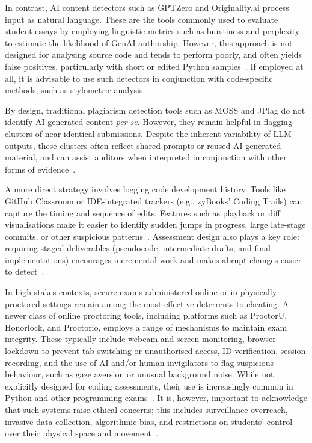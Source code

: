 In contrast, AI content detectors such as GPTZero and Originality.ai process input as natural language. These are the tools commonly used to evaluate student essays by employing linguistic metrics such as burstiness and perplexity to estimate the likelihood of GenAI authorship. However, this approach is not designed for analysing source code and tends to perform poorly, and often yields false positives, particularly with short or edited Python samples~\cite{grammarly_inc_how_2025}. If employed at all, it is advisable to use such detectors in conjunction with code-specific methods, such as stylometric analysis.

By design, traditional plagiarism detection tools such as MOSS and JPlag do not identify AI-generated content \textit{per se}. However, they remain helpful in flagging clusters of near-identical submissions. Despite the inherent variability of LLM outputs, these clusters often reflect shared prompts or reused AI-generated material, and can assist auditors when interpreted in conjunction with other forms of evidence~\cite{hoq_detecting_2024}.

A more direct strategy involves logging code development history. Tools like GitHub Classroom or IDE-integrated trackers (e.g., zyBooks' Coding Trails) can capture the timing and sequence of edits. Features such as playback or diff visualisations make it easier to identify sudden jumps in progress, large late-stage commits, or other suspicious patterns~\cite{vahid_chatgpt_2023}. Assessment design also plays a key role: requiring staged deliverables (pseudocode, intermediate drafts, and final implementations) encourages incremental work and makes abrupt changes easier to detect~\cite{xie_ai_2023}.

In high-stakes contexts, secure exams administered online or in physically proctored settings remain among the most effective deterrents to cheating. A newer class of online proctoring tools, including platforms such as ProctorU, Honorlock, and Proctorio, employs a range of mechanisms to maintain exam integrity. These typically include webcam and screen monitoring, browser lockdown to prevent tab switching or unauthorised access, ID verification, session recording, and the use of AI and/or human invigilators to flag suspicious behaviour, such as gaze aversion or unusual background noise. While not explicitly designed for coding assessments, their use is increasingly common in Python and other programming exams~\cite{mahon_guidelines_2024}. It is, however, important to acknowledge that such systems raise ethical concerns; this includes surveillance overreach, invasive data collection, algorithmic bias, and restrictions on students' control over their physical space and movement~\cite{lee_online_2022}.

